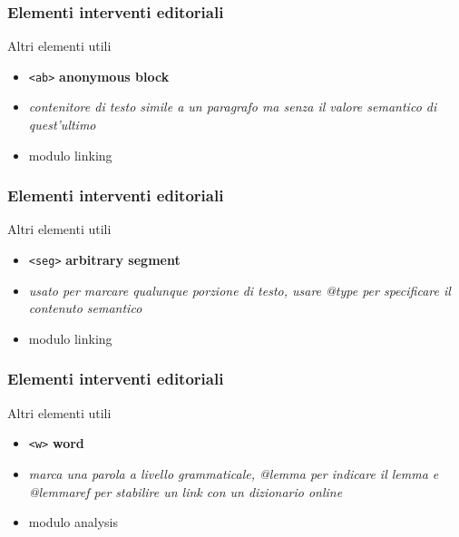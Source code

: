 \begin{frame}
    \frametitle{Elementi interventi editoriali}
    \addtocounter{nframe}{1}
    
    \begin{block}{Altri elementi utili}
        \begin{itemize}
            \item \texttt{<ab>} \textbf{anonymous block}
            \item[] \textit{contenitore di testo simile a un paragrafo ma senza il valore semantico di quest’ultimo}
            \item[] modulo linking
        \end{itemize}
        
    \end{block}
    
\end{frame} 

\begin{frame}
    \frametitle{Elementi interventi editoriali}
    \addtocounter{nframe}{1}
    
    \begin{block}{Altri elementi utili}
        \begin{itemize}
            \item \texttt{<seg>} \textbf{arbitrary segment}
            \item[] \textit{usato per marcare qualunque porzione di testo, usare @type per specificare il contenuto semantico}
            \item[] modulo linking
        \end{itemize}
        
    \end{block}
    
\end{frame} 

\begin{frame}
    \frametitle{Elementi interventi editoriali}
    \addtocounter{nframe}{1}
    
    \begin{block}{Altri elementi utili}
        \begin{itemize}
            \item \texttt{<w>} \textbf{word}
            \item[] \textit{marca una parola a livello grammaticale, @lemma per indicare il lemma e @lemmaref per stabilire un link con un dizionario online}
            \item[] modulo analysis
        \end{itemize}
        
    \end{block}
    
\end{frame}


